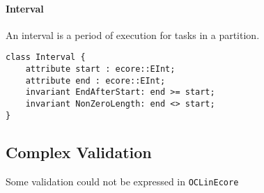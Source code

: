 \paragraph{Interval}
An interval is a period of execution for tasks in a partition.
\begin{lstlisting}[caption=Interval constraints]
class Interval {
    attribute start : ecore::EInt;
    attribute end : ecore::EInt;
    invariant EndAfterStart: end >= start;
    invariant NonZeroLength: end <> start;
}
\end{lstlisting}
\subsection{Complex Validation}
Some validation could not be expressed in \texttt{OCLinEcore}

